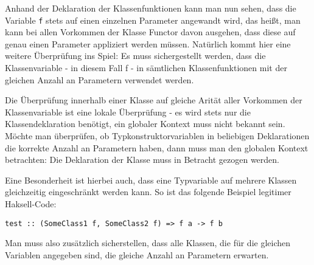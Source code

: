 Anhand der Deklaration der Klassenfunktionen kann man nun sehen, dass die Variable \texttt{f} stets auf einen einzelnen 
Parameter angewandt wird, das heißt, man kann bei allen Vorkommen der Klasse Functor davon ausgehen, dass diese
auf genau einen Parameter appliziert werden müssen. Natürlich kommt hier eine weitere Überprüfung ins Spiel: Es muss
sichergestellt werden, dass die Klassenvariable - in diesem Fall f - in sämtlichen Klassenfunktionen mit der gleichen Anzahl an
Parametern verwendet werden.

Die Überprüfung innerhalb einer Klasse auf gleiche Arität aller Vorkommen der Klassenvariable ist eine lokale Überprüfung -
es wird stets nur die Klassendeklaration benötigt, ein globaler Kontext muss nicht bekannt sein. Möchte man überprüfen,
ob Typkonstruktorvariablen in beliebigen Deklarationen die korrekte Anzahl an Parametern haben, dann muss man den
globalen Kontext betrachten: Die Deklaration der Klasse muss in Betracht gezogen werden.

Eine Besonderheit ist hierbei auch, dass eine Typvariable auf mehrere Klassen gleichzeitig eingeschränkt werden kann. So ist
das folgende Beispiel legitimer Haksell-Code:

\begin{verbatim}
test :: (SomeClass1 f, SomeClass2 f) => f a -> f b
\end{verbatim}

Man muss also zusätzlich sicherstellen, dass alle Klassen, die für die gleichen Variablen angegeben sind, die gleiche Anzahl an
Parametern erwarten.
